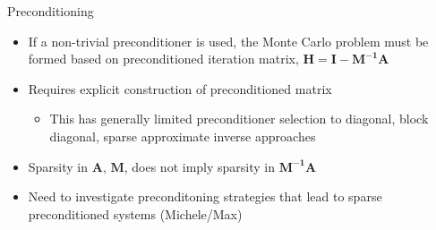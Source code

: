 \documentclass{beamer}
\begin{document}
\begin{frame}{Preconditioning}
  \begin{itemize}
    \item If a non-trivial preconditioner is used, the Monte Carlo problem
      must be formed based on preconditioned iteration matrix,
      $\mathbf{H} = \mathbf{I-M^{-1}A}$
    \vfill
    \item Requires explicit construction of preconditioned matrix
      \begin{itemize}
        \item This has generally limited preconditioner selection to diagonal,
          block diagonal, sparse approximate inverse approaches
      \end{itemize}
    \vfill
    \item Sparsity in $\mathbf{A}$, $\mathbf{M}$, does not imply sparsity
      in $\mathbf{M^{-1}A}$
    \vfill
    \item Need to investigate preconditoning strategies that lead to sparse
      preconditioned systems (Michele/Max)
  \end{itemize}
\end{frame}
\end{document}
